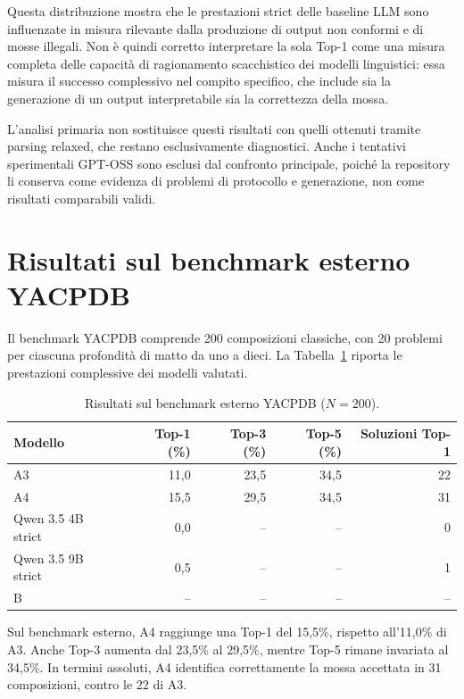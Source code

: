 Questa distribuzione mostra che le prestazioni strict delle baseline LLM sono influenzate in misura rilevante dalla produzione di output non conformi e di mosse illegali. Non è quindi corretto interpretare la sola Top-1 come una misura completa delle capacità di ragionamento scacchistico dei modelli linguistici: essa misura il successo complessivo nel compito specifico, che include sia la generazione di un output interpretabile sia la correttezza della mossa.

L'analisi primaria non sostituisce questi risultati con quelli ottenuti tramite parsing relaxed, che restano esclusivamente diagnostici. Anche i tentativi sperimentali GPT-OSS sono esclusi dal confronto principale, poiché la repository li conserva come evidenza di problemi di protocollo e generazione, non come risultati comparabili validi.

\section{Risultati sul benchmark esterno YACPDB}

Il benchmark YACPDB comprende 200 composizioni classiche, con 20 problemi per ciascuna profondità di matto da uno a dieci. La Tabella~\ref{tab:main-classic-results} riporta le prestazioni complessive dei modelli valutati.

\begin{table}[htbp]
    \centering
    \small
    \caption{Risultati sul benchmark esterno YACPDB (\(N=200\)).}
    \label{tab:main-classic-results}
    \begin{tabular}{lrrrr}
        \toprule
        Modello & Top-1 (\%) & Top-3 (\%) & Top-5 (\%) & Soluzioni Top-1 \\
        \midrule
        A3 & 11,0 & 23,5 & 34,5 & 22 \\
        A4 & 15,5 & 29,5 & 34,5 & 31 \\
        Qwen 3.5 4B strict & 0,0 & -- & -- & 0 \\
        Qwen 3.5 9B strict & 0,5 & -- & -- & 1 \\
        B & -- & -- & -- & -- \\
        \bottomrule
    \end{tabular}
\end{table}

Sul benchmark esterno, A4 raggiunge una Top-1 del 15,5\%, rispetto all'11,0\% di A3. Anche Top-3 aumenta dal 23,5\% al 29,5\%, mentre Top-5 rimane invariata al 34,5\%. In termini assoluti, A4 identifica correttamente la mossa accettata in 31 composizioni, contro le 22 di A3.

